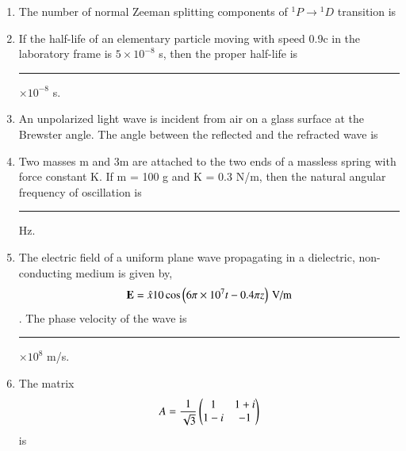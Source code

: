 \documentclass[journal,12pt,onecolumn]{IEEEtran}
\theoremstyle{remark}
\begin{document}
\begin{enumerate}
\item The number of normal Zeeman splitting components of ${}^1P \rightarrow {}^1D$ transition is
\hfill{} \begin{enumerate}  \end{enumerate}

\item If the half-life of an elementary particle moving with speed 0.9c in the laboratory frame is $5 \times 10^{-8}$ s, then the proper half-life is \rule{3cm}{0.4pt} $\times 10^{-8}$ s. \hfill{}

\item An unpolarized light wave is incident from air on a glass surface at the Brewster angle. The angle between the reflected and the refracted wave is
\hfill{} \begin{enumerate}  \end{enumerate}

\item Two masses m and 3m are attached to the two ends of a massless spring with force constant K. If m = 100 g and K = 0.3 N/m, then the natural angular frequency of oscillation is \rule{3cm}{0.4pt} Hz.\hfill{}

\item The electric field of a uniform plane wave propagating in a dielectric, non-conducting medium is given by, $$\mathbf{E} = \hat{x} 10 \cos\left(6\pi \times 10^7 t - 0.4\pi z\right) \, \text{V/m}$$. The phase velocity of the wave is \rule{3cm}{0.4pt} $\times 10^8$ m/s.\hfill{}

\item The matrix $$A = \frac{1}{\sqrt{3}} \begin{pmatrix} 1 & 1+i \\ 1-i & -1 \end{pmatrix}$$ is
\hfill{} \begin{enumerate}  \end{enumerate}


\end{enumerate}
\end{document}
